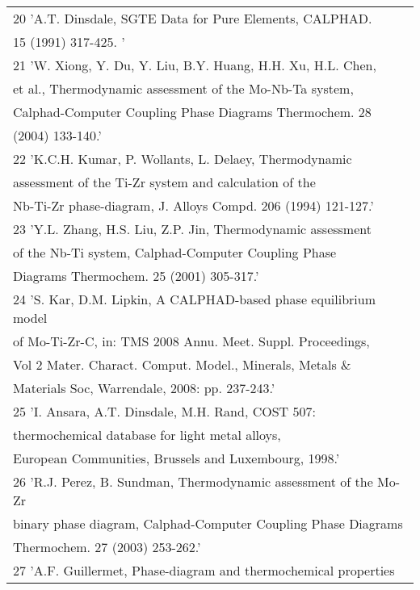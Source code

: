 \begin{longtable}[H]{ l l l }
	\multicolumn{3}{l}{20     'A.T. Dinsdale, SGTE Data for Pure Elements, CALPHAD.}\\ 
	\multicolumn{3}{l}{15 (1991) 317-425. '}\\
	\multicolumn{3}{l}{21     'W. Xiong, Y. Du, Y. Liu, B.Y. Huang, H.H. Xu, H.L. Chen,}\\ 
	\multicolumn{3}{l}{et al., Thermodynamic assessment of the Mo-Nb-Ta system,}\\ 
	\multicolumn{3}{l}{Calphad-Computer Coupling Phase Diagrams Thermochem. 28}\\ 
	\multicolumn{3}{l}{(2004) 133-140.'}\\
	\multicolumn{3}{l}{22     'K.C.H. Kumar, P. Wollants, L. Delaey, Thermodynamic}\\ 
	\multicolumn{3}{l}{assessment of the Ti-Zr system and calculation of the}\\ 
	\multicolumn{3}{l}{Nb-Ti-Zr phase-diagram, J. Alloys Compd. 206 (1994) 121-127.'}\\
	\multicolumn{3}{l}{23	  'Y.L. Zhang, H.S. Liu, Z.P. Jin, Thermodynamic assessment}\\ 
	\multicolumn{3}{l}{of the Nb-Ti system, Calphad-Computer Coupling Phase}\\ 
	\multicolumn{3}{l}{Diagrams Thermochem. 25 (2001) 305-317.'}\\
	\multicolumn{3}{l}{24	  'S. Kar, D.M. Lipkin, A CALPHAD-based phase equilibrium model}\\ 
	\multicolumn{3}{l}{of Mo-Ti-Zr-C, in: TMS 2008 Annu. Meet. Suppl. Proceedings,}\\ 
	\multicolumn{3}{l}{Vol 2 Mater. Charact. Comput. Model., Minerals, Metals \&}\\ 
	\multicolumn{3}{l}{Materials Soc, Warrendale, 2008: pp. 237-243.'}\\ 
	\multicolumn{3}{l}{25	  'I. Ansara, A.T. Dinsdale, M.H. Rand, COST 507:}\\ 
	\multicolumn{3}{l}{thermochemical database for light metal alloys,}\\ 
	\multicolumn{3}{l}{European Communities, Brussels and Luxembourg, 1998.'}\\
	\multicolumn{3}{l}{26	  'R.J. Perez, B. Sundman, Thermodynamic assessment of the Mo-Zr}\\
	\multicolumn{3}{l}{binary phase diagram, Calphad-Computer Coupling Phase Diagrams}\\ 
	\multicolumn{3}{l}{Thermochem. 27 (2003) 253-262.'}\\ 
	\multicolumn{3}{l}{27	  'A.F. Guillermet, Phase-diagram and thermochemical properties}\\

\end{longtable}
